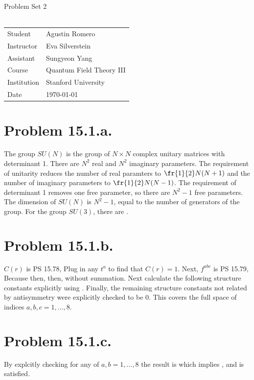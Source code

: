 \documentclass{article}
\begin{document}
\begin{center}
{\Large{Problem Set 2}}\\~\\
\begin{tabular}{l l}
Student&Agustin Romero\\
Instructor&Eva Silverstein\\
Assistant&Sungyeon Yang\\
Course&Quantum Field Theory III\\    
Institution&Stanford University\\
Date&\today\\
\end{tabular}
\end{center}
\section*{Problem 15.1.a.}
The group $SU(N)$ is the group of $N\times N$ complex unitary matrices with determinant 1. There are $N^2$ real and $N^2$ imaginary parameters. The requirement of unitarity reduces the number of real paramters to $\fr{1}{2}N(N+1)$ and the number of imaginary parameters to $\fr{1}{2}N(N-1)$.
The requirement of determinant 1 removes one free parameter, so there are $N^2-1$ free parameters. The dimension of $SU(N)$ is $N^2-1$, equal to the number of generators of the group. For the group $SU(3)$, there are .
\section*{Problem 15.1.b.}
$C(r)$ is PS 15.78,
Plug in any $t^a$ to find that $C(r)=1$. Next, $f^{abc}$ is PS 15.79,
Because
then,
then,
without summation. Next calculate the following structure constants explicitly using .
Finally, the remaining structure constants not related by antisymmetry were explicitly checked to be 0. This covers the full space of indices $a,b,c=1,...,8$.
\section*{Problem 15.1.c.}
By explcitly checking 
for any of $a,b=1,...,8$ the result is
which implies , and 
is satisfied.
\end{document}
